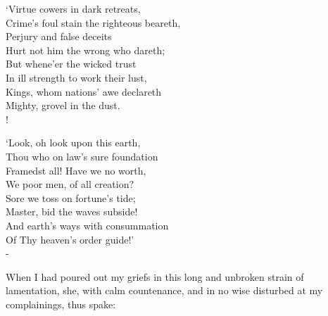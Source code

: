 \documentclass[12pt]{book}
\newenvironment{vpoem}[1]%
  {\def\poemvsindentlines{#1}\begin{poem}\small}%
  {\end{poem}\def\poemvsindentlines{\relax}}
\begin{document}
\begin{vpoem}{24568}
    `Virtue cowers in dark retreats, \\
      Crime's foul stain the righteous beareth, \\
    Perjury and false deceits \\
      Hurt not him the wrong who dareth; \\
        But whene'er the wicked trust \\
        In ill strength to work their lust, \\
      Kings, whom nations' awe declareth \\
        Mighty, grovel in the dust. \\!
 
    `Look, oh look upon this earth, \\
      Thou who on law's sure foundation \\
    Framedst all! Have we no worth, \\
      We poor men, of all creation? \\
        Sore we toss on fortune's tide; \\
        Master, bid the waves subside! \\
      And earth's ways with consummation \\
        Of Thy heaven's order guide!' \\-
\end{vpoem}


When I had poured out my griefs in this long and unbroken strain of
lamentation, she, with calm countenance, and in no wise disturbed at my
complainings, thus spake:
\end{document}
